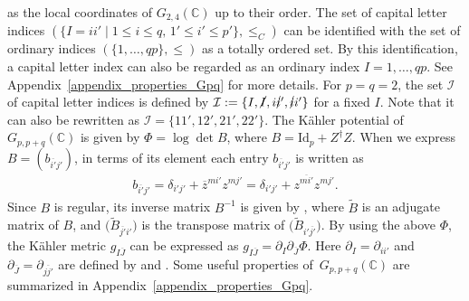 \documentclass[pdftex]{sigma}
\numberwithin{equation}{section}
\begin{document}
as the local coordinates of $G_{2,4}(\mathbb{C})$ up to their order. The set of capital letter indices
$
 (
 \{
 I=ii'
\mid
 1
 \leq
 i
 \leq
 q,\,
 1'
 \leq
 i'
 \leq
 p'
 \},
 \leq_{C}
 )
$
can be identified with the set of ordinary indices
$
 (
 \{
 1,\dots,qp
 \},
 \leq
 )
$
as a totally ordered set. By this identification, a capital letter index can also be regarded as an ordinary index
$
 I
 =
 1,
 \dots,
 qp
$.
See Appendix~\ref{appendix_properties_Gpq} for more details.
For $p=q=2$, the set $\mathcal{I}$ of capital letter indices is defined by
$
\mathcal{I}
:=
\{
I,
\cancel{I},
i\cancel{i}',
\cancel{i}i'
\}
$
for a fixed $I$.
Note that it can also be rewritten as
$
\mathcal{I}
=
\{
11',
12',
21',
22'
\}
$.
The K\"ahler potential of $G_{p,p+q}(\mathbb{C})$ is given by
$
 \Phi
 =
 \log
 \det
 B$,
where
$
 B
 =
 \mathrm{Id}_{p}
 +
 Z^{\dagger}
 Z
$.
When we express
$
 B
 =
 (
 b_{\overline{i'}j'}
 )
$,
in terms of its element each entry $b_{\overline{i'}j'}$ is written as
\begin{align}
 b_{\overline{i'}j'}
 =
 \delta_{i'j'}
 +
 \overline{z}^{mi'}
 z^{mj'}
 =
 \delta_{i'j'}
 +
 z^{\overline{mi'}}
 z^{mj'}.
 \label{b_entry}
\end{align}
Since $B$ is regular, its inverse matrix $B^{-1}$ is given by
,
where $\widetilde{B}$ is an adjugate matrix of $B$, and
$
 \bigl(
 \widetilde{B}_{\overline{j'}i'}
 \bigr)
$
is the transpose matrix of
$
 \bigl(
 \widetilde{B}_{i'\overline{j'}}
 \bigr)
$.
By using the above $\Phi$, the K\"ahler metric $g_{I\overline{J}}$ can be expressed as
$
 g_{I\overline{J}}
 =
 \partial_{I}
 \partial_{\overline{J}}
 \Phi
$.
Here $\partial_{I}=\partial_{ii'}$ and $\partial_{\overline{J}}=\partial_{\overline{jj'}}$ are defined by
and
.
Some useful properties of~${G_{p,p+q}(\mathbb{C})}$ are summarized in Appendix~\ref{appendix_properties_Gpq}.
\end{document}
